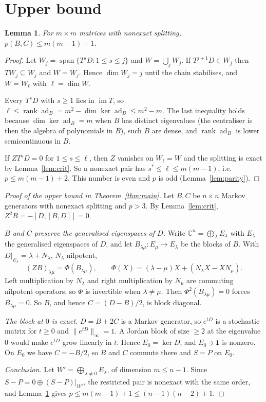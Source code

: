 \documentclass[11pt]{article}
\newtheorem{lemma}{Lemma}
\theoremstyle{remark}
\newcommand{\ad}{\operatorname{ad}}
\newcommand{\im}{\operatorname{im}}
\newcommand{\spn}{\operatorname{span}}
\newcommand{\one}{\mathbf{1}}
\begin{document}
\section{Upper bound}

\begin{lemma}\label{lem:arb}
For $m\times m$ matrices with nonexact splitting, $p(B,C)\le m(m-1)+1$.
\end{lemma}

\begin{proof}
Let $W_j=\spn\{T^{s}D:1\le s\le j\}$ and $W=\bigcup_jW_j$. If
$T^{j+1}D\in W_j$ then $TW_j\subseteq W_j$ and $W=W_j$. Hence
$\dim W_j=j$ until the chain stabilises, and $W=W_\ell$ with
$\ell=\dim W$.

Every $T^{s}D$ with $s\ge1$ lies in $\im T$, so
$\ell\le\operatorname{rank}\ad_B=m^{2}-\dim\ker\ad_B\le m^{2}-m$.
The last inequality holds because $\dim\ker\ad_B=m$ when $B$ has
distinct eigenvalues (the centraliser is then the algebra of polynomials
in $B$), such $B$ are dense, and $\operatorname{rank}\ad_B$ is lower
semicontinuous in $B$.

If $ZT^{s}D=0$ for $1\le s\le\ell$, then $Z$ vanishes on $W_\ell=W$ and
the splitting is exact by Lemma~\ref{lem:crit}. So a nonexact pair has
$s^*\le\ell\le m(m-1)$, i.e.\ $p\le m(m-1)+2$. This number is even and
$p$ is odd (Lemma~\ref{lem:parity}).
\end{proof}

\begin{proof}[Proof of the upper bound in Theorem~\ref{thm:main}]
Let $B,C$ be $n\times n$ Markov generators with nonexact splitting and
$p>3$. By Lemma~\ref{lem:crit}, $Z^{2}B=-[D,[B,D]]=0$.

\emph{$B$ and $C$ preserve the generalised eigenspaces of $D$.}
Write $\mathbb C^{n}=\bigoplus_\lambda E_\lambda$ with $E_\lambda$ the
generalised eigenspaces of $D$, and let
$B_{\lambda\mu}:E_\mu\to E_\lambda$ be the blocks of $B$. With
$D|_{E_\lambda}=\lambda+N_\lambda$, $N_\lambda$ nilpotent,
$$
(ZB)_{\lambda\mu}=\Phi(B_{\lambda\mu}),\qquad
\Phi(X)=(\lambda-\mu)X+(N_\lambda X-XN_\mu).
$$
Left multiplication by $N_\lambda$ and right multiplication by $N_\mu$
are commuting nilpotent operators, so $\Phi$ is invertible when
$\lambda\ne\mu$. Then $\Phi^{2}(B_{\lambda\mu})=0$ forces
$B_{\lambda\mu}=0$. So $B$, and hence $C=(D-B)/2$, is block diagonal.

\emph{The block at $0$ is exact.}
$D=B+2C$ is a Markov generator, so $e^{tD}$ is a stochastic matrix for
$t\ge0$ and $\|e^{tD}\|_\infty=1$. A Jordan block of size $\ge2$ at the
eigenvalue $0$ would make $e^{tD}$ grow linearly in $t$. Hence
$E_0=\ker D$, and $E_0\ni\one$ is nonzero. On $E_0$ we have
$C=-B/2$, so $B$ and $C$ commute there and $S=P$ on $E_0$.

\emph{Conclusion.}
Let $W'=\bigoplus_{\lambda\ne0}E_\lambda$, of dimension
$m\le n-1$. Since $S-P=0\oplus(S-P)|_{W'}$, the restricted pair is
nonexact with the same order, and Lemma~\ref{lem:arb} gives
$p\le m(m-1)+1\le(n-1)(n-2)+1$.
\end{proof}
\end{document}
